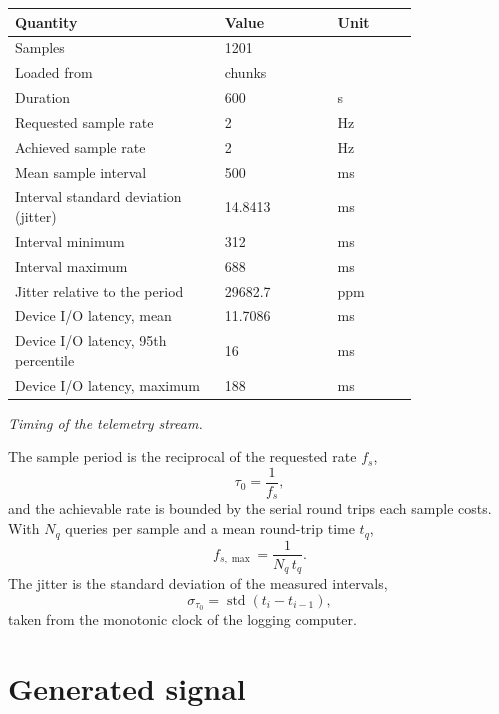 \documentclass[11pt]{article}
\begin{document}
\begin{center}
\begin{tabular}{@{}p{0.52\linewidth}p{0.28\linewidth}l@{}}
\toprule
\textbf{Quantity} & \textbf{Value} & \textbf{Unit} \\
\midrule
Samples & 1201 &  \\
Loaded from & chunks &  \\
Duration & 600 & s \\
Requested sample rate & 2 & Hz \\
Achieved sample rate & 2 & Hz \\
Mean sample interval & 500 & ms \\
Interval standard deviation (jitter) & 14.8413 & ms \\
Interval minimum & 312 & ms \\
Interval maximum & 688 & ms \\
Jitter relative to the period & 29682.7 & ppm \\
Device I/O latency, mean & 11.7086 & ms \\
Device I/O latency, 95th percentile & 16 & ms \\
Device I/O latency, maximum & 188 & ms \\
\bottomrule
\end{tabular}

\emph{Timing of the telemetry stream.}
\end{center}

The sample period is the reciprocal of the requested rate $f_s$,
\begin{equation}
  \tau_0 = \frac{1}{f_s},
\end{equation}
and the achievable rate is bounded by the serial round trips each sample
costs. With $N_q$ queries per sample and a mean round-trip time $t_q$,
\begin{equation}
  f_{s,\max} = \frac{1}{N_q\,t_q}.
\end{equation}
The jitter is the standard deviation of the measured intervals,
\begin{equation}
  \sigma_{\tau_0} = \operatorname{std}\left(t_i - t_{i-1}\right),
\end{equation}
taken from the monotonic clock of the logging computer.

\section{Generated signal}
\end{document}
